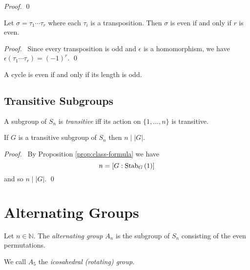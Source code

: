 \begin{proof}
\pf
{}
\qed
\end{proof}

\begin{prop}
Let $\sigma = \tau_1 \cdots \tau_r$ where each $\tau_i$ is a transposition. Then $\sigma$ is even if and only if $r$ is even.
\end{prop}

\begin{proof}
\pf\ Since every transposition is odd and $\epsilon$ is a homomorphism, we have $\epsilon(\tau_1 \cdots \tau_r) = (-1)^r$. \qed
\end{proof}

\begin{cor}
A cycle is even if and only if its length is odd.
\end{cor}

\subsection{Transitive Subgroups}

\begin{df}[Transitive]
A subgroup of $S_n$ is \emph{transitive} iff its action on $\{1, \ldots, n\}$ is transitive.
\end{df}

\begin{prop}
If $G$ is a transitive subgroup of $S_n$ then $n \mid |G|$.
\end{prop}

\begin{proof}
\pf\ By Proposition \ref{prop:class-formula} we have
\[ n = [G : \mathrm{Stab}_{G} \left( {1} \right)] \]
and so $n \mid |G|$. \qed
\end{proof}

\section{Alternating Groups}

\begin{df}
Let $n \in \mathbb{N}$. The \emph{alternating group} $A_n$ is the subgroup of $S_n$ consisting of the even permutations.

We call $A_5$ the \emph{icosahedral (rotating) group}.
\end{df}

